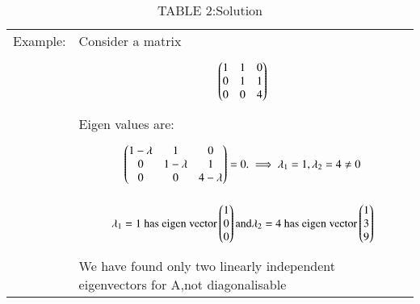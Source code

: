 \documentclass[journal,12pt,twocolumn]{IEEEtran}
\begin{document}
\begin{table*}[!t]
\begin{tabular}{|l|l|}
Example:&Consider a matrix\\&\parbox{12cm}{\begin{align}
 \begin{pmatrix}
1 &1 &0\\
0&1&1\\
0&0&4\end{pmatrix}\end{align}}\\
&Eigen values are:\\
&\parbox{12cm}{\begin{align}
 \begin{pmatrix}
1 -\lambda &1 &0\\
0&1-\lambda&1\\
0&0&4-\lambda\end{pmatrix}=0.
\implies\lambda_1=1,\lambda_2=4\neq 0\end{align}}\\
&\parbox{12cm}{\begin{align}
  \lambda_1=1\text { has eigen vector}
 \begin{pmatrix}1\\0\\0\end{pmatrix} \text{and} 
  \lambda_2=4 \text{ has eigen vector}
\begin{pmatrix}1\\3\\9\end{pmatrix}
\end{align}}\\
 & We have found only two linearly independent eigenvectors for A,not diagonalisable
\\
\hline
    \end{tabular}
    \caption*{TABLE 2:Solution}
\end{table*}
\end{document}
